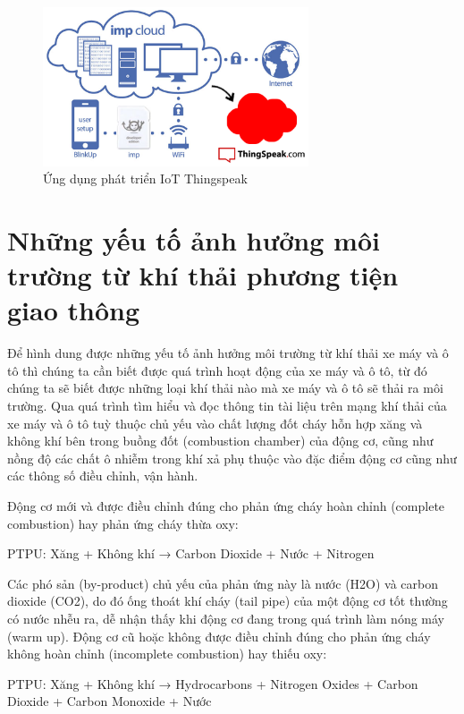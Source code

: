 \begin{figure}[H] 
\centering    
\includegraphics[width=0.7\textwidth]{thingspeak}
\caption[Ứng dụng phát triển IoT Thingspeak]{Ứng dụng phát triển IoT Thingspeak}
\label{fig:thingspeak}
\end{figure}

\section{Những yếu tố ảnh hưởng môi trường từ khí thải phương tiện giao thông}\label{sec:yeuto_khithai}
Để hình dung được những yếu tố ảnh hưởng môi trường từ khí thải xe máy và ô tô thì chúng ta cần biết được quá trình hoạt động của xe máy và ô tô, từ đó chúng ta sẽ biết được những loại khí thải nào mà xe máy và ô tô sẽ thải ra môi trường. Qua quá trình tìm hiểu và đọc thông tin tài liệu trên mạng khí thải của xe máy và ô tô tuỳ thuộc chủ yếu vào chất lượng đốt cháy hỗn hợp xăng và không khí bên trong buồng đốt (combustion chamber) của động cơ, cũng như nồng độ các chất ô nhiễm trong khí xả phụ thuộc vào đặc điểm động cơ cũng như các thông số điều chỉnh, vận hành.

Động cơ mới và được điều chỉnh đúng cho phản ứng cháy hoàn chỉnh (complete combustion) hay phản ứng cháy thừa oxy:

\begin{center}
PTPU: Xăng + Không khí → Carbon Dioxide + Nước + Nitrogen
\end{center} 
Các phó sản (by-product) chủ yếu của phản ứng này là nước (H2O) và carbon dioxide (CO2), do đó ống thoát khí cháy (tail pipe) của một động cơ tốt thường có nước nhễu ra, dễ nhận thấy khi động cơ đang trong quá trình làm nóng máy (warm up).
Động cơ cũ hoặc không được điều chỉnh đúng cho phản ứng cháy không hoàn chỉnh (incomplete combustion) hay thiếu oxy:
\begin{center}
PTPU: Xăng + Không khí → Hydrocarbons + Nitrogen Oxides + Carbon Dioxide + Carbon Monoxide + Nước
\end{center}

